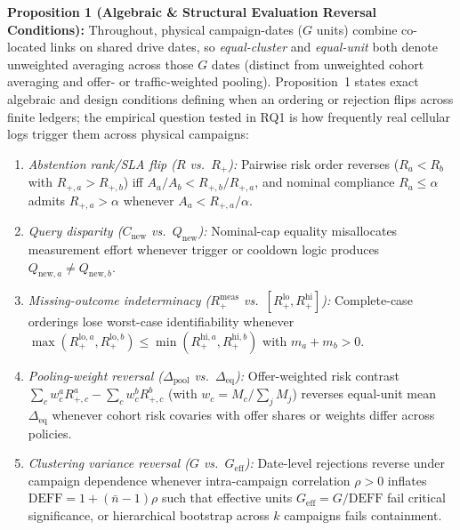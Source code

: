 \documentclass[journal,10pt]{IEEEtran}
\begin{document}
\textbf{Proposition 1 (Algebraic \& Structural Evaluation Reversal Conditions):} Throughout, physical campaign-dates ($G$ units) combine co-located links on shared drive dates, so \emph{equal-cluster} and \emph{equal-unit} both denote unweighted averaging across those $G$ dates (distinct from unweighted cohort averaging and offer- or traffic-weighted pooling). Proposition~1 states exact algebraic and design conditions defining when an ordering or rejection flips across finite ledgers; the empirical question tested in RQ1 is how frequently real cellular logs trigger them across physical campaigns:
\begin{enumerate}
\item \emph{Abstention rank/SLA flip ($R$ vs.\ $R_+$):} Pairwise risk order reverses ($R_a < R_b$ with $R_{+,a} > R_{+,b}$) iff $A_a/A_b < R_{+,b}/R_{+,a}$, and nominal compliance $R_a \le \alpha$ admits $R_{+,a} > \alpha$ whenever $A_a < R_{+,a}/\alpha$.
\item \emph{Query disparity ($C_{\text{new}}$ vs.\ $Q_{\text{new}}$):} Nominal-cap equality misallocates measurement effort whenever trigger or cooldown logic produces $Q_{\text{new},a} \ne Q_{\text{new},b}$.
\item \emph{Missing-outcome indeterminacy ($R_+^{\text{meas}}$ vs.\ $[R_+^{\text{lo}}, R_+^{\text{hi}}]$):} Complete-case orderings lose worst-case identifiability whenever $\max(R_+^{\text{lo},a}, R_+^{\text{lo},b}) \le \min(R_+^{\text{hi},a}, R_+^{\text{hi},b})$ with $m_a + m_b > 0$.
\item \emph{Pooling-weight reversal ($\Delta_{\text{pool}}$ vs.\ $\Delta_{\text{eq}}$):} Offer-weighted risk contrast $\sum_c w_c^a R_{+,c}^a - \sum_c w_c^b R_{+,c}^b$ (with $w_c = M_c / \sum_j M_j$) reverses equal-unit mean $\Delta_{\text{eq}}$ whenever cohort risk covaries with offer shares or weights differ across policies.
\item \emph{Clustering variance reversal ($G$ vs.\ $G_{\text{eff}}$):} Date-level rejections reverse under campaign dependence whenever intra-campaign correlation $\rho > 0$ inflates $\text{DEFF}=1+(\bar{n}-1)\rho$ such that effective units $G_{\text{eff}}=G/\text{DEFF}$ fail critical significance, or hierarchical bootstrap across $k$ campaigns fails containment.
\end{enumerate}
\end{document}
